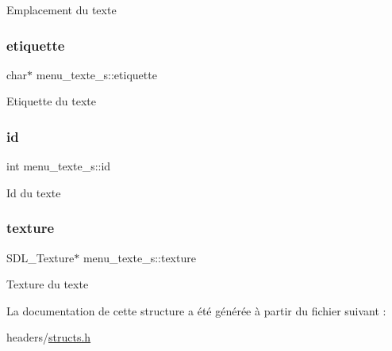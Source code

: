 Emplacement du texte \mbox{\label{structmenu__texte__s_a84789ab6f657a0e69c9f5931d25bbcab}} 
\subsubsection{\texorpdfstring{etiquette}{etiquette}}
{\footnotesize\ttfamily char$\ast$ menu\+\_\+texte\+\_\+s\+::etiquette}

Etiquette du texte \mbox{\label{structmenu__texte__s_a7826dcecd14251361929dc821a137e1f}} 
\subsubsection{\texorpdfstring{id}{id}}
{\footnotesize\ttfamily int menu\+\_\+texte\+\_\+s\+::id}

Id du texte \mbox{\label{structmenu__texte__s_a1177e58383e5fd4a43def0c959d2244d}} 
\subsubsection{\texorpdfstring{texture}{texture}}
{\footnotesize\ttfamily S\+D\+L\+\_\+\+Texture$\ast$ menu\+\_\+texte\+\_\+s\+::texture}

Texture du texte 

La documentation de cette structure a été générée à partir du fichier suivant \+:\begin{DoxyCompactItemize}
\item 
headers/\hyperlink{structs_8h}{structs.\+h}\end{DoxyCompactItemize}
